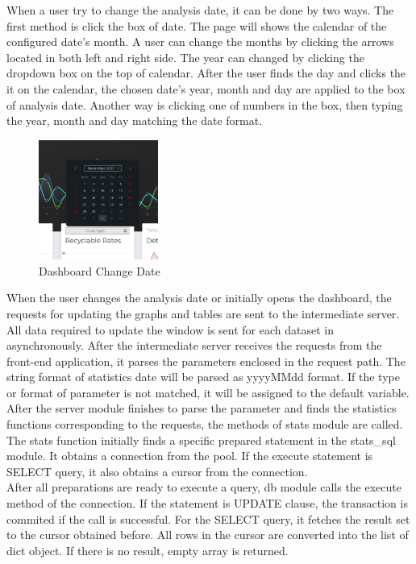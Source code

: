 \documentclass[conference]{IEEEtran}
\begin{document}
When a user try to change the analysis date, it can be done by two ways. The first method is click the box of date. The page will shows the calendar of the configured date's month. A user can change the months by clicking the arrows located in both left and right side. The year can changed by clicking the dropdown box on the top of calendar. After the user finds the day and clicks the it on the calendar, the chosen date's year, month and day are applied to the box of analysis date. Another way is clicking one of numbers in the box, then typing the year, month and day matching the date format.\\

\begin{figure}[h]
    \centering
    \includegraphics[width=0.35\textwidth]{images/dashboard_change_date.eps}
    \caption{Dashboard Change Date}
\end{figure}

When the user changes the analysis date or initially opens the dashboard, the requests for updating the graphs and tables are sent to the intermediate server. All data required to update the window is sent for each dataset in asynchronously. After the intermediate server receives the requests from the front-end application, it parses the parameters enclosed in the request path. The string format of statistics date will be parsed as yyyyMMdd format. If the type or format of parameter is not matched, it will be assigned to the default variable.\\

After the server module finishes to parse the parameter and finds the statistics functions corresponding to the requests, the methods of stats module are called. The stats function initially finds a specific prepared statement in the stats\_sql module. It obtains a connection from the pool. If the execute statement is SELECT query, it also obtains a cursor from the connection.\\

After all preparations are ready to execute a query, db module calls the execute method of the connection. If the statement is UPDATE clause, the transaction is commited if the call is successful. For the SELECT query, it fetches the result set to the cursor obtained before. All rows in the cursor are converted into the list of dict object. If there is no result, empty array is returned.\\
\end{document}
